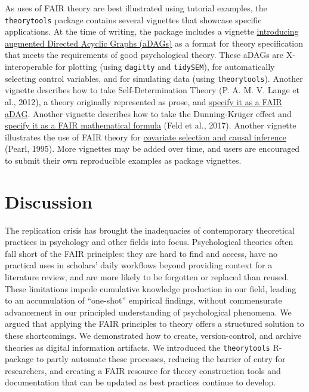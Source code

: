 \documentclass[
  man, noextraspace,floatsintext]{apa7}
\begin{document}
As uses of FAIR theory are best illustrated using tutorial examples,
the \texttt{theorytools} package contains several vignettes that showcase specific applications.
At the time of writing, the package includes a
vignette \href{https://cjvanlissa.github.io/theorytools/articles/augmented_dags.html}{introducing augmented Directed Acyclic Graphs (aDAGs)} as a format for theory specification that meets the requirements of good psychological theory.
These aDAGs are X-interoperable for plotting (using \texttt{dagitty} and \texttt{tidySEM}),
for automatically selecting control variables, and for simulating data (using \texttt{theorytools}).
Another vignette describes how to take Self-Determination Theory (P. A. M. V. Lange et al., 2012), a theory originally represented as prose, and \href{https://cjvanlissa.github.io/theorytools/articles/formalizing_sdt.html}{specify it as a FAIR aDAG}.
Another vignette describes how to take the Dunning-Krüger effect and \href{https://cjvanlissa.github.io/theorytools/articles/dunning-kruger.html}{specify it as a FAIR mathematical formula} (Feld et al., 2017).
Another vignette illustrates the use of FAIR theory for \href{https://cjvanlissa.github.io/theorytools/articles/causal-inference.html}{covariate selection and causal inference} (Pearl, 1995).
More vignettes may be added over time, and users are encouraged to submit their own reproducible examples as package vignettes.

\section{Discussion}\label{discussion}

The replication crisis has brought the inadequacies of contemporary theoretical practices in psychology and other fields into focus.
Psychological theories often fall short of the FAIR principles:
they are hard to find and access, have no practical uses in scholars' daily workflows beyond providing context for a literature review,
and are more likely to be forgotten or replaced than reused.
These limitations impede cumulative knowledge production in our field,
leading to an accumulation of ``one-shot'' empirical findings, without commensurate advancement in our principled understanding of psychological phenomena.
We argued that applying the FAIR principles to theory offers a structured solution to these shortcomings.
We demonstrated how to create, version-control, and archive theories as digital information artifacts.
We introduced the \texttt{theorytools} R-package to partly automate these processes, reducing the barrier of entry for researchers,
and creating a FAIR resource for theory construction tools and documentation that can be updated as best practices continue to develop.
\end{document}
